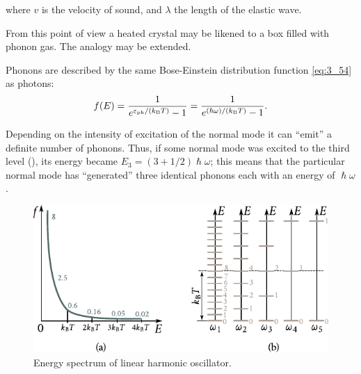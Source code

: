 \noindent
where $v$ is the velocity of sound, and $\lambda$ the length of the elastic wave.

From this point of view a heated crystal may be likened to a box filled with phonon gas. The analogy may be extended.

Phonons are described by the same Bose-Einstein distribution function \eqref{eq:3_54} as photons:
\begin{equation*}
    f(E) = \frac{1}{e^{\varepsilon_{\text{ph}}/(k_{\text{B}}T)} - 1} = \frac{1}{e^{(\hslash\omega)/(k_{\text{B}}T)} - 1}.
\end{equation*}

\noindent
Depending on the intensity of excitation of the normal mode it can ``emit'' a definite number of phonons. Thus, if some normal mode was excited to the third level (), its energy became $E_3=(3+1/2)\hslash\omega$; this means that the particular normal mode has ``generated'' three identical phonons each with an energy of $\hslash\omega$.

\begin{figure}[t]
	\begin{center}
		\includegraphics[scale=1]{figures/ch_04/fig_4_4.pdf}
		\caption[]{Energy spectrum of linear harmonic oscillator.}
		\label{fig:4_4}
	\end{center}
	\vspace{-0.7cm}
\end{figure}

